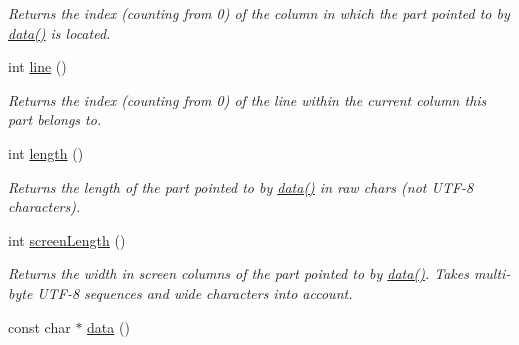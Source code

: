 \begin{DoxyCompactItemize}
\begin{DoxyCompactList}\small\item\em \-Returns the index (counting from 0) of the column in which the part pointed to by \hyperlink{classoption_1_1_print_usage_implementation_1_1_line_part_iterator_ada26229add63bd479c7877f2f8e32908}{data()} is located. \end{DoxyCompactList}\item 
\hypertarget{classoption_1_1_print_usage_implementation_1_1_line_part_iterator_a8ad1201d95bf0bd9453a731da8c15a10}{int \hyperlink{classoption_1_1_print_usage_implementation_1_1_line_part_iterator_a8ad1201d95bf0bd9453a731da8c15a10}{line} ()}\label{classoption_1_1_print_usage_implementation_1_1_line_part_iterator_a8ad1201d95bf0bd9453a731da8c15a10}

\begin{DoxyCompactList}\small\item\em \-Returns the index (counting from 0) of the line within the current column this part belongs to. \end{DoxyCompactList}\item 
\hypertarget{classoption_1_1_print_usage_implementation_1_1_line_part_iterator_a557e521cb41e951a34df2737d25f9dce}{int \hyperlink{classoption_1_1_print_usage_implementation_1_1_line_part_iterator_a557e521cb41e951a34df2737d25f9dce}{length} ()}\label{classoption_1_1_print_usage_implementation_1_1_line_part_iterator_a557e521cb41e951a34df2737d25f9dce}

\begin{DoxyCompactList}\small\item\em \-Returns the length of the part pointed to by \hyperlink{classoption_1_1_print_usage_implementation_1_1_line_part_iterator_ada26229add63bd479c7877f2f8e32908}{data()} in raw chars (not \-U\-T\-F-\/8 characters). \end{DoxyCompactList}\item 
\hypertarget{classoption_1_1_print_usage_implementation_1_1_line_part_iterator_a03b6fedfe805d7fc73216da5cd33270e}{int \hyperlink{classoption_1_1_print_usage_implementation_1_1_line_part_iterator_a03b6fedfe805d7fc73216da5cd33270e}{screen\-Length} ()}\label{classoption_1_1_print_usage_implementation_1_1_line_part_iterator_a03b6fedfe805d7fc73216da5cd33270e}

\begin{DoxyCompactList}\small\item\em \-Returns the width in screen columns of the part pointed to by \hyperlink{classoption_1_1_print_usage_implementation_1_1_line_part_iterator_ada26229add63bd479c7877f2f8e32908}{data()}. \-Takes multi-\/byte \-U\-T\-F-\/8 sequences and wide characters into account. \end{DoxyCompactList}\item 
\hypertarget{classoption_1_1_print_usage_implementation_1_1_line_part_iterator_ada26229add63bd479c7877f2f8e32908}{const char $\ast$ \hyperlink{classoption_1_1_print_usage_implementation_1_1_line_part_iterator_ada26229add63bd479c7877f2f8e32908}{data} ()}\label{classoption_1_1_print_usage_implementation_1_1_line_part_iterator_ada26229add63bd479c7877f2f8e32908}


\end{DoxyCompactItemize}
